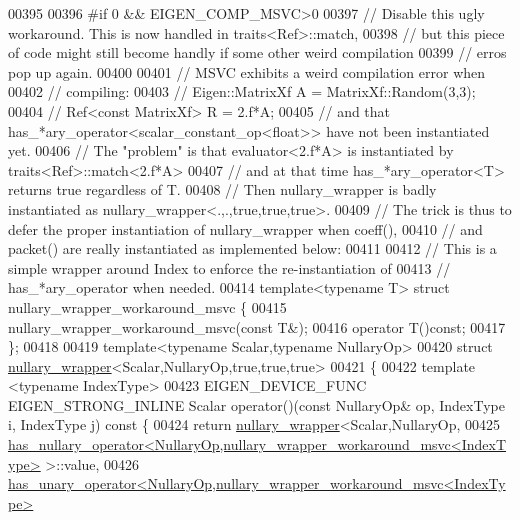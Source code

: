 \begin{DoxyCode}
00395 
00396 \textcolor{preprocessor}{#if 0 && EIGEN\_COMP\_MSVC>0}
00397 \textcolor{comment}{// Disable this ugly workaround. This is now handled in traits<Ref>::match,}
00398 \textcolor{comment}{// but this piece of code might still become handly if some other weird compilation}
00399 \textcolor{comment}{// erros pop up again.}
00400 
00401 \textcolor{comment}{// MSVC exhibits a weird compilation error when}
00402 \textcolor{comment}{// compiling:}
00403 \textcolor{comment}{//    Eigen::MatrixXf A = MatrixXf::Random(3,3);}
00404 \textcolor{comment}{//    Ref<const MatrixXf> R = 2.f*A;}
00405 \textcolor{comment}{// and that has\_*ary\_operator<scalar\_constant\_op<float>> have not been instantiated yet.}
00406 \textcolor{comment}{// The "problem" is that evaluator<2.f*A> is instantiated by traits<Ref>::match<2.f*A>}
00407 \textcolor{comment}{// and at that time has\_*ary\_operator<T> returns true regardless of T.}
00408 \textcolor{comment}{// Then nullary\_wrapper is badly instantiated as nullary\_wrapper<.,.,true,true,true>.}
00409 \textcolor{comment}{// The trick is thus to defer the proper instantiation of nullary\_wrapper when coeff(),}
00410 \textcolor{comment}{// and packet() are really instantiated as implemented below:}
00411 
00412 \textcolor{comment}{// This is a simple wrapper around Index to enforce the re-instantiation of}
00413 \textcolor{comment}{// has\_*ary\_operator when needed.}
00414 \textcolor{keyword}{template}<\textcolor{keyword}{typename} T> \textcolor{keyword}{struct }nullary\_wrapper\_workaround\_msvc \{
00415   nullary\_wrapper\_workaround\_msvc(\textcolor{keyword}{const} T&);
00416   \textcolor{keyword}{operator} T()\textcolor{keyword}{const};
00417 \};
00418 
00419 \textcolor{keyword}{template}<\textcolor{keyword}{typename} Scalar,\textcolor{keyword}{typename} NullaryOp>
00420 \textcolor{keyword}{struct }\hyperlink{struct_eigen_1_1internal_1_1nullary__wrapper}{nullary\_wrapper}<Scalar,NullaryOp,true,true,true>
00421 \{
00422   \textcolor{keyword}{template} <\textcolor{keyword}{typename} IndexType>
00423   EIGEN\_DEVICE\_FUNC EIGEN\_STRONG\_INLINE Scalar operator()(\textcolor{keyword}{const} NullaryOp& op, IndexType i, IndexType j)\textcolor{keyword}{
       const }\{
00424     \textcolor{keywordflow}{return} \hyperlink{struct_eigen_1_1internal_1_1nullary__wrapper}{nullary\_wrapper}<Scalar,NullaryOp,
00425     \hyperlink{struct_eigen_1_1internal_1_1has__nullary__operator}{has\_nullary\_operator<NullaryOp,nullary\_wrapper\_workaround\_msvc<IndexType>}
       >::value,
00426     \hyperlink{struct_eigen_1_1internal_1_1has__unary__operator}{has\_unary\_operator<NullaryOp,nullary\_wrapper\_workaround\_msvc<IndexType>}

\end{DoxyCode}
